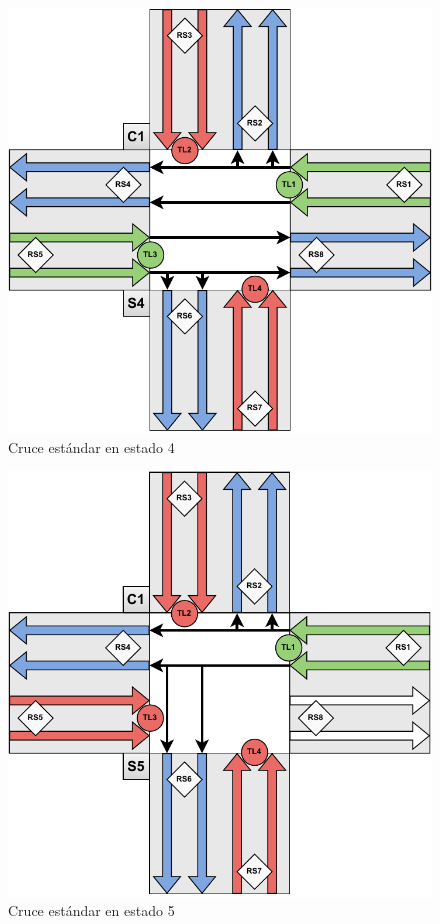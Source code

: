 \begin{figure}[H]
    \centering
    \includegraphics[width=1\linewidth]{text/image/DCruc-CE-Estado4.pdf}
    \caption{Cruce estándar en estado 4}
    \label{fig:cruce_estandar_estado_4}
\end{figure}

\begin{figure}[H]
    \centering
    \includegraphics[width=1\linewidth]{text/image/DCruc-CE-Estado5.pdf}
    \caption{Cruce estándar en estado 5}
    \label{fig:cruce_estandar_estado_5}
\end{figure}

